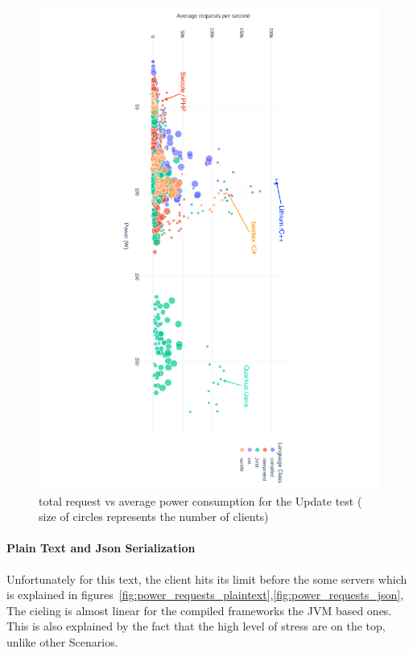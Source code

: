\begin{figure}[hbt]
    \caption{total request vs average power consumption for the Update test ( size of circles represents the number of clients) }
    \label{fig:power_requests_update}
    \includegraphics[width=
        \columnwidth,angle=9
        0]{imgs/power_requests_update}

\end{figure}

\paragraph{Plain Text and Json Serialization}
Unfortunately for this text, the client hits its limit before the some servers which is explained in figures~\ref{fig:power_requests_plaintext},\ref{fig:power_requests_json}, The cieling is almost linear for the compiled frameworks the JVM based ones. This is also explained by the fact that the high level of stress are on the top, unlike other Scenarios.


